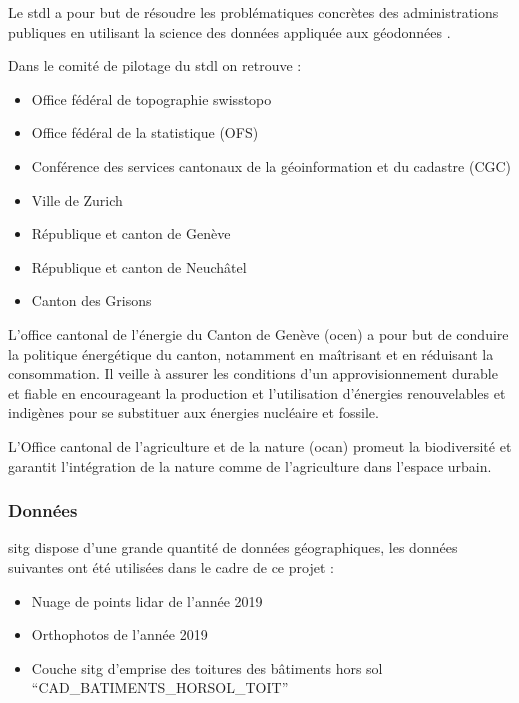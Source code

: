 {\par{Le \acrshort{stdl} a pour but de résoudre les problématiques concrètes des administrations publiques en utilisant la science des données appliquée aux géodonnées \cite{stdl_swiss_nodate}.}

Dans le comité de pilotage du \acrshort{stdl} on retrouve :
\begin{itemize}
    \item Office fédéral de topographie swisstopo
    \item Office fédéral de la statistique (OFS)
    \item Conférence des services cantonaux de la géoinformation et du cadastre (CGC)
    \item Ville de Zurich
    \item République et canton de Genève
    \item République et canton de Neuchâtel
    \item Canton des Grisons
\end{itemize}

\par{L'office cantonal de l'énergie du Canton de Genève (\acrshort{ocen}) a pour but de conduire la politique énergétique du canton, notamment en maîtrisant et en réduisant la consommation. Il veille à assurer les conditions d'un approvisionnement durable et fiable en encourageant la production et l'utilisation d'énergies renouvelables et indigènes pour se substituer aux énergies nucléaire et fossile. \cite{etat_de_geneve_office_nodate-1}}

\par{L'Office cantonal de l'agriculture et de la nature (\acrshort{ocan}) promeut la biodiversité et garantit l'intégration de la nature comme de l'agriculture dans l'espace urbain. \cite{etat_de_geneve_office_nodate}}

\subsubsection{Données}

\par{\acrshort{sitg} dispose d'une grande quantité de données géographiques, les données suivantes ont été utilisées dans le cadre de ce projet :}
\begin{itemize}
    \item Nuage de points \gls{lidar} de l'année 2019 \cite{sitg_nuages_nodate}
    \item Orthophotos de l'année 2019 \cite{sitg_orthophotos_nodate}
    \item Couche \acrshort{sitg} d'emprise des toitures des bâtiments hors sol ``CAD\_BATIMENTS\_HORSOL\_TOIT'' \cite{sitg_toits_nodate}
\end{itemize}

}
